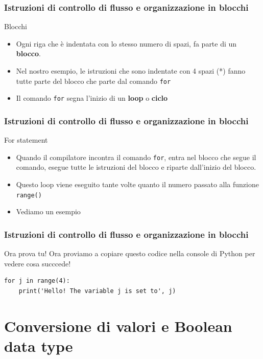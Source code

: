 \documentclass{beamer}
\begin{document}
\begin{frame}[fragile]
\frametitle{Istruzioni di controllo di flusso e organizzazione in blocchi}
    \begin{block}{Blocchi}
    \begin{itemize}
        \item Ogni riga che è indentata con lo stesso numero di spazi, fa parte di un \textbf{blocco}.
        \item Nel nostro esempio, le istruzioni che sono indentate con 4 spazi (*) fanno tutte parte del blocco che parte dal comando \texttt{for}
        \item Il comando \texttt{for} segna l'inizio di un \textbf{loop} o \textbf{ciclo}
    \end{itemize}
    \end{block}
\end{frame}

\begin{frame}[fragile]
\frametitle{Istruzioni di controllo di flusso e organizzazione in blocchi}
    \begin{block}{For statement}
    \begin{itemize}
        \item Quando il compilatore incontra il comando \texttt{for}, entra nel blocco che segue il comando, esegue tutte le istruzioni del blocco e riparte dall'inizio del blocco.
        \item Questo loop viene eseguito tante volte quanto il numero passato alla funzione \texttt{range()}
        \item Vediamo un esempio
    \end{itemize}
    \end{block}
\end{frame}

\begin{frame}[fragile]
\frametitle{Istruzioni di controllo di flusso e organizzazione in blocchi}
\begin{block}{Ora prova tu!}
	Ora proviamo a copiare questo codice nella console di Python per vedere cosa succcede!
\end{block}
\begin{lstlisting}
for j in range(4):
    print('Hello! The variable j is set to', j)
\end{lstlisting}
    
\end{frame}

\section{Conversione di valori e Boolean data type}
\end{document}
